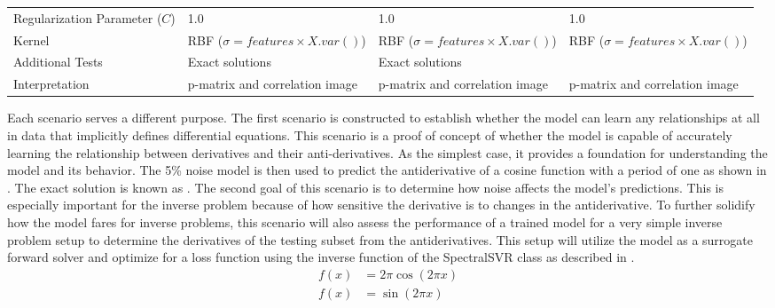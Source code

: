 \begin{table}[H]
\begin{tabularx}{\textwidth}{L{0.75}*{3}{L{1.09}}}
    Regularization Parameter (\(C\)) & 1.0                                                 & 1.0                                                                 & 1.0                                        \\\addlinespace[0.5em]
    Kernel                           & RBF (\(\sigma = features \times X.var()\))          & RBF (\(\sigma = features \times X.var()\))                          & RBF (\(\sigma = features \times X.var()\)) \\\addlinespace[0.5em]
    Additional Tests                 & Exact solutions                                     & Exact solutions                                                     &                                            \\\addlinespace[0.5em]
    Interpretation                   & p-matrix and correlation image                      & p-matrix and correlation image                                      & p-matrix and correlation image             \\
    \bottomrule
  \end{tabularx}
\end{table}

Each scenario serves a different purpose. The first scenario is constructed to establish whether the model can learn any relationships at all in data that implicitly defines differential equations. This scenario is a proof of concept of whether the model is capable of accurately learning the relationship between derivatives and their anti-derivatives. As the simplest case, it provides a foundation for understanding the model and its behavior. The 5\% noise model is then used to predict the antiderivative of a cosine function with a period of one as shown in . The exact solution is known as  \autocite{abramowitzHandbookMathematicalFunctions1972}. The second goal of this scenario is to determine how noise affects the model's predictions. This is especially important for the inverse problem because of how sensitive the derivative is to changes in the antiderivative. To further solidify how the model fares for inverse problems, this scenario will also assess the performance of a trained model for a very simple inverse problem setup to determine the derivatives of the testing subset from the antiderivatives. This setup will utilize the model as a surrogate forward solver and optimize for a loss function using the inverse function of the SpectralSVR class as described in .
\begin{align}
  f(x) & = 2\pi \cos\left(2\pi x\right)\label{eq:sine_derivative} \\
  f(x) & = \sin\left(2\pi x\right)\label{eq:sine_function}
\end{align}

